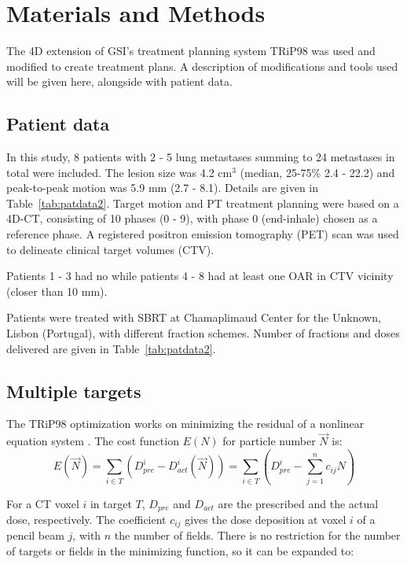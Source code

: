 \documentclass[type=dr, dr=rernat, accentcolor=tud7b,colorbacktitle, bigchapter, openright, twoside, 12pt ]{tudthesis}
\begin{document}
\newpage
\section{Materials and Methods}

The 4D extension of GSI's treatment planning system TRiP98 \cite{Kraemer2000a, Richter2013} was used and modified to create treatment plans. A description of modifications and tools used will be given here, 
alongside with patient data.

\subsection{Patient data}


In this study, 8 patients with 2 - 5 lung metastases summing to 24 metastases in total were included. The lesion size was 4.2 cm$^3$ (median, 25-75\% 2.4 - 22.2) and peak-to-peak motion was 5.9 mm (2.7 - 8.1). 
Details are given in Table~\ref{tab:patdata2}.
Target motion and PT treatment planning were based on a 4D-CT, consisting of 10 phases (0 - 9), with phase 0 (end-inhale) chosen as a reference phase.
A registered positron emission tomography (PET) scan was used to delineate clinical target volumes (CTV). 

Patients 1 - 3 had no while patients 4 - 8 had at least one OAR in CTV vicinity (closer than 10 mm).

Patients were treated with SBRT at Chamaplimaud Center for the Unknown, Lisbon (Portugal), with different fraction schemes. 
Number of fractions and doses delivered are given in Table~\ref{tab:patdata2}.
 

\subsection{Multiple targets}

The TRiP98 optimization works on minimizing the residual of a nonlinear equation system \cite{Kraemer2000a}. The cost function $E(N)$ for particle number $\vec{N}$ is:
\begin{equation}
\label{eq-costFunc}
 E(\vec{N}) = \sum_{i\in T} \left( D_{pre}^{i} - D_{act}^{i}(\vec{N})\right) = \sum_{i\in T} \left( D_{pre}^{i} -\sum_{j=1}^n c_{ij}N\right)
\end{equation}

For a CT voxel $i$ in target $T$, $ D_{pre}$ and $D_{act}$ are the prescribed and the actual dose, respectively. The coefficient $c_{ij}$ gives the dose deposition at voxel $i$ of a pencil beam $j$, 
with $n$ the number of fields. There is no restriction for the number of targets or fields in the minimizing function, so it can be expanded to:
\end{document}
